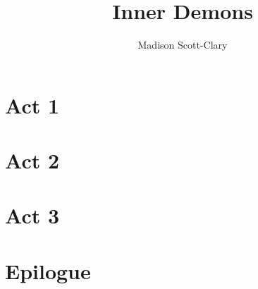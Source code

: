 \documentclass[12pt,letterpaper,oneside]{memoir}
\title{Inner Demons}
\author{Madison Scott-Clary}
\begin{document}
  \maketitle

  \newpage

  \tableofcontents

  \part{Act 1}
  

  \part{Act 2}
  

  \part{Act 3}
  
  
  
  

  \part{Epilogue}
  
\end{document}
